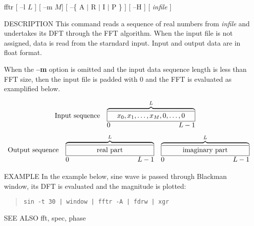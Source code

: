 
\begin{synopsis}
 \item[fftr] [ --l $L$ ] [ --m $M$] [ --\{ A $|$ R $|$ I $|$ P \} ] [ --H ]
	     [ {\em infile} ] 
\end{synopsis}

\begin{qsection}{DESCRIPTION}
This command reads a sequence of real numbers from {\em infile}
and undertakes its DFT through the FFT algorithm.
When the input file is not assigned, data is read from the starndard
input.
Input and output data are in float format.
\par
When the {\bf --m} option is omitted
and the input data sequence length is less than FFT size,
then the input file is padded with 0 and the FFT is evaluated
as examplified below.

\begin{displaymath}
\begin{array}{lll}
\mbox{Input sequence} & 
\overbrace{\framebox[4.5cm]{$x_0, x_1, \ldots, x_{M}, 0,
					\ldots,0$}}^{L}  & \\
		& \makebox[4.5cm]{0\hfill $L-1$} &
\end{array}
\end{displaymath}
\begin{displaymath}
\begin{array}{lll}
\mbox{Output sequence} & \overbrace{\framebox[4.5cm]{real part}}^{L} &
	   \overbrace{\framebox[4.5cm]{imaginary part}}^{L} \\
		& \makebox[4.5cm]{0\hfill $L-1$} &
		\makebox[4.5cm]{0\hfill $L-1$}
\end{array}
\end{displaymath}
\end{qsection}

\begin{options}
\end{options}

\begin{qsection}{EXAMPLE}
In the example below, sine wave is passed through Blackman window,
its DFT is evaluated and the magnitude is plotted:
\begin{quote}
  \verb!sin -t 30 | window | fftr -A | fdrw | xgr!
\end{quote}

\end{qsection}

\begin{qsection}{SEE ALSO}
  fft, spec, phase
\end{qsection}
